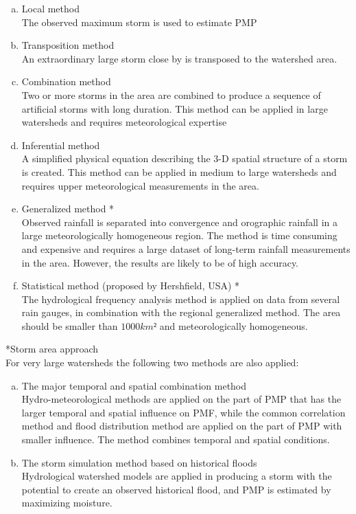 \documentclass[12pt,a4paper,english]{article}
\begin{document}
\begin{enumerate}[a)]
\item Local method\\
The observed maximum storm is used to estimate PMP
\item Transposition method\\
An extraordinary large storm close by is transposed to the watershed area.
\item Combination method\\
Two or more storms in the area are combined to produce a sequence of artificial storms with long duration. This method can be applied in large watersheds and requires meteorological expertise 
\item Inferential method\\
A simplified physical equation describing the 3-D spatial structure of a storm is created. This method can be applied in medium to large watersheds and requires upper meteorological measurements in the area.
\item Generalized method *\\
Observed rainfall is separated into convergence and orographic rainfall in a large meteorologically homogeneous region. The method is time consuming and expensive and requires a large dataset of long-term rainfall measurements in the area. However, the results are likely to be of high accuracy. 
\item Statistical method (proposed by Hershfield, USA) *\\
The hydrological frequency analysis method is applied on data from several rain gauges, in combination with the regional generalized method. The area should be smaller than $1000 km²$ and meteorologically homogeneous. 
\end{enumerate}
*Storm area approach\\

\noindent For very large watersheds the following two methods are also applied:
\begin{enumerate}[a)]
\item The major temporal and spatial combination method\\
Hydro-meteorological methods are applied on the part of PMP that has the larger temporal and spatial influence on PMF, while the common correlation method and flood distribution method are applied on the part of PMP with smaller influence. The method combines temporal and spatial conditions.
\item The storm simulation method based on historical floods\\ 
Hydrological watershed models are applied in producing a storm with the potential to create an observed historical flood, and PMP is estimated by maximizing moisture.
\end{enumerate}
\end{document}
